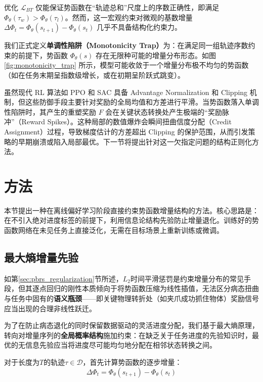 优化 $\mathcal{L}_{BT}$ 仅能保证势函数在“轨迹总和”尺度上的序数正确性，即满足 $\Phi_\theta(\tau_w) > \Phi_\theta(\tau_l)$。然而，这一宏观约束对微观的基数增量 $\Delta \Phi_t = \Phi_\theta(s_{t+1}) - \Phi_\theta(s_t)$ 几乎不具备结构化约束力。

我们正式定义\textbf{单调性陷阱（Monotonicity Trap）}为：在满足同一组轨迹序数约束的前提下，势函数 $\Phi_\theta(s)$ 存在无限种可能的增量分布形态。如图 \ref{fig:monotonicity_trap} 所示，模型可能收敛于一个增量分布极不均匀的势函数（如在任务末期呈指数级增长，或在初期呈阶跃式跳变）。

虽然现代 RL 算法如 PPO \cite{schulman2017} 和 SAC \cite{haarnoja2018} 具备 Advantage Normalization 和 Clipping 机制，但这些防御手段主要针对奖励的全局均值和方差进行平滑。当势函数落入单调性陷阱时，其产生的重塑奖励 $F$ 会在关键状态转换处产生极端的“奖励脉冲”（Reward Spikes）。这种局部的数值爆炸会瞬间扭曲信度分配（Credit Assignment）过程，导致梯度估计的方差超出 Clipping 的保护范围，从而引发策略的早期崩溃或陷入局部最优。下一节将提出针对这一欠指定问题的结构正则化方法。

\section{方法}

本节提出一种在离线偏好学习阶段直接约束势函数增量结构的方法。核心思路是：在不引入绝对进度标签的前提下，利用信息论结构先验防止增量退化。训练好的势函数网络在未见任务上直接泛化，无需在目标场景上重新训练或微调。

\subsection{最大熵增量先验}

如第\ref{sec:pbrs_regularization}节所述，$L_2$时间平滑惩罚是约束增量分布的常见手段，但其逐点回归的刚性本质倾向于将势函数压缩为线性插值，无法区分病态扭曲与任务中固有的\textbf{语义瓶颈}——即关键物理转折处（如夹爪成功抓住物体）奖励信号应当出现的合理非线性跃迁。

为了在防止病态退化的同时保留数据驱动的灵活进度分配，我们基于最大熵原理\cite{shannon1948,jaynes1957}，转向对增量序列的\textbf{全局概率结构}施加约束：在缺乏关于任务进度的先验知识时，最优的无信息先验应当将进度尽可能均匀地分配在相邻状态转换之间。

对于长度为$T$的轨迹$\tau \in \mathcal{D}$，首先计算势函数的逐步增量：
\begin{equation}
\label{eq:delta_phi}
    \Delta\Phi_t = \Phi_\theta(s_{t+1}) - \Phi_\theta(s_t)
\end{equation}

